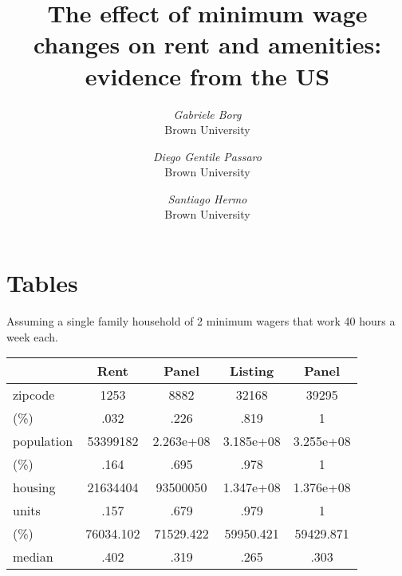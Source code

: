 \documentclass{article}
\title{The effect of minimum wage changes on rent and amenities: evidence from the US}
\author{
	\textit{Gabriele Borg} \\
	\small Brown University 
	\and
	\textit{Diego Gentile Passaro} \\
	\small Brown University
	\and
	\textit{Santiago Hermo} \\
	\small Brown University
}
\begin{document}
\maketitle

\section*{Tables}

Assuming a single family household of 2 minimum wagers that work 40 hours a week each. 
\begin{table}[h!]
\centering
\resizebox{\textwidth}{!}{

}
\end{table}

\begin{table}[htbp!]
\begin{tabular}{|l|c|c|c|c|}\hline  
 & Rent  & Panel  & Listing  & Panel  \\ \hline  
zipcode & 1253 & 8882 & 32168 & 39295 \\ \hline 
(\%) & .032 & .226 & .819 & 1 \\ \hline 
population & 53399182 & 2.263e+08 & 3.185e+08 & 3.255e+08 \\ \hline 
(\%) & .164 & .695 & .978 & 1 \\ \hline 
housing & 21634404 & 93500050 & 1.347e+08 & 1.376e+08 \\ \hline 
units & .157 & .679 & .979 & 1 \\ \hline 
(\%) & 76034.102 & 71529.422 & 59950.421 & 59429.871 \\ \hline 
median & .402 & .319 & .265 & .303 \\ \hline 
  \end{tabular}
\end{table}
\end{document}
